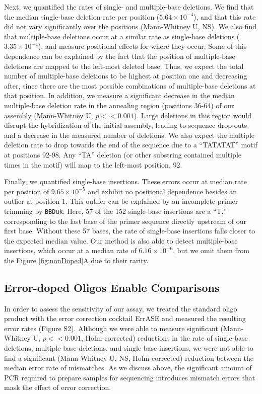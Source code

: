 \documentclass[letterpaper,12pt]{article}
\begin{document}
Next, we quantified the rates of single- and multiple-base deletions. We find that the median single-base deletion rate per position ($5.64\times10^{-4}$), and that this rate did not vary significantly over the positions (Mann-Whitney U, NS). We also find that multiple-base deletions occur at a similar rate as single-base deletions ($3.35\times10^{-4}$), and measure positional effects for where they occur. Some of this dependence can be explained by the fact that the position of multiple-base deletions are mapped to the left-most deleted base. Thus, we expect the total number of multiple-base deletions to be highest at position one and decreasing after, since there are the most possible combinations of multiple-base deletions at that position. In addition, we measure a significant decrease in the median multiple-base deletion rate in the annealing region (positions 36-64) of our assembly (Mann-Whitney U, $p << 0.001$). Large deletions in this region would disrupt the hybridization of the initial assembly, leading to sequence drop-outs and a decrease in the measured number of deletions. We also expect the multiple deletion rate to drop towards the end of the sequence due to a “TATATAT” motif at positions 92-98. Any “TA” deletion (or other substring contained multiple times in the motif) will map to the left-most position, 92.

Finally, we quantified single-base insertions. These errors occur at median rate per position of $9.65\times10^{-5}$ and exhibit no positional dependence besides an outlier at position 1.  This outlier can be explained by an incomplete primer trimming by \texttt{BBDuk}. Here, 57 of the 152 single-base insertions are a “T,” corresponding to the last base of the primer sequence directly upstream of our first base. Without these 57 bases, the rate of single-base insertions falls closer to the expected median value. Our method is also able to detect multiple-base insertions, which occur at a median rate of $6.16\times10^{-6}$, but we omit them from the Figure \ref{fig:nonDoped}A due to their rarity.

\subsection*{Error-doped Oligos Enable Comparisons}
In order to assess the sensitivity of our assay, we treated the standard oligo product with the error correction cocktail ErrASE and measured the resulting error rates (Figure S2). Although we were able to measure significant (Mann-Whitney U, $p << 0.001$, Holm-corrected) reductions in the rate of single-base deletions, multiple-base deletions, and single-base insertions, we were not able to find a significant (Mann-Whitney U, NS, Holm-corrected) reduction between the median error rate of mismatches. As we discuss above, the significant amount of PCR required to prepare samples for sequencing introduces mismatch errors that mask the effect of error correction.
\end{document}
